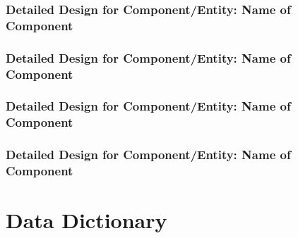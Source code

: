 			\subsubsection{Detailed Design for Component/Entity: Name of Component}
			\subsubsection{Detailed Design for Component/Entity: Name of Component}
			\subsubsection{Detailed Design for Component/Entity: Name of Component}
			\subsubsection{Detailed Design for Component/Entity: Name of Component}
	\section{Data Dictionary}